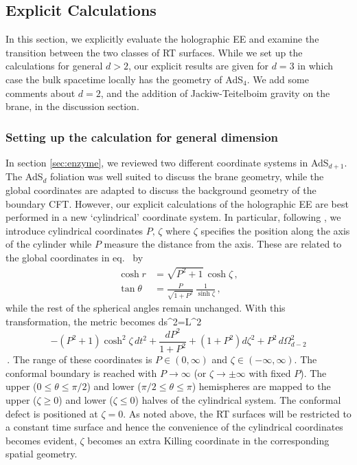 
\subsection{Explicit Calculations}\label{sec:examples}

In this section, we explicitly evaluate the holographic EE and examine the transition between the two classes of RT surfaces. While we set up the calculations for general $d>2$, our explicit results are given for $d=3$ in which case the bulk spacetime locally has the geometry of AdS$_{4}$. We add some comments about $d=2$, and the addition of Jackiw-Teitelboim gravity  on the brane, in the discussion section.

\subsubsection*{Setting up the calculation for general dimension}

In section \ref{sec:enzyme}, we reviewed two different coordinate systems in AdS$_{d+1}$. The AdS$_d$ foliation  was well suited to discuss the brane geometry, while the global coordinates are adapted to discuss the background geometry of the boundary CFT. However, our explicit calculations of the holographic EE are best performed in a new `cylindrical' coordinate system. In particular, following \cite{Krtous:2014pva}, we introduce cylindrical coordinates $P,\,\zeta$ where $\zeta$ specifies the position along the axis of the cylinder while $P$ measure the distance from the axis. These are related to the global coordinates in eq.~ by
\begin{align}\label{cylie}
\cosh r&=\sqrt{P^2+1}\,\cosh\zeta\,,\\
\tan\theta&=\frac{P}{\sqrt{1+P^2}}\,\frac{1}{\sinh\zeta}\,,
\end{align}
while the rest of the spherical angles remain unchanged. With this transformation, the metric becomes
\beq\label{cylindd}
ds^2=L^2\[ -(P^2+1)\cosh^2\zeta\, dt^2+\frac{dP^2}{1+P^2}+\left( 1+P^2 \right)d\zeta^2+P^2\,d\Omega_{d-2}^2\]\,.
\eeq
The range of these coordinates is $P\in (0,\infty)$ and $\zeta\in(-\infty,\infty)$. The conformal boundary is reached with $P\to \infty$ (or $\zeta\to\pm\infty$ with fixed $P$).  The upper ($0\le\theta\le\pi/2$) and lower ($\pi/2\le\theta\le\pi$) hemispheres are mapped to the upper ($\zeta\ge0$) and lower ($\zeta\le0$) halves of the cylindrical system. The conformal defect is positioned at $\zeta=0$. As noted above, the RT surfaces will be restricted to a constant time surface and hence the convenience of the cylindrical coordinates becomes evident, \ie  $\zeta$ becomes an extra Killing coordinate in the corresponding spatial geometry.


